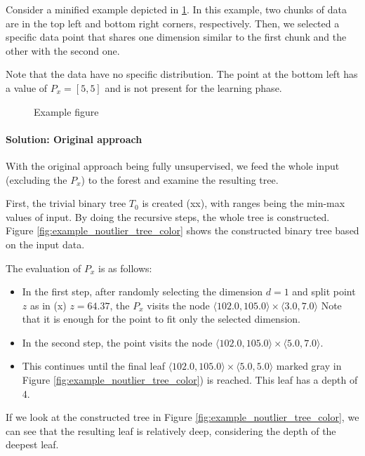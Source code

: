 Consider a minified example depicted in \ref{fig:example_data}. In this example, two chunks of data are in the top left and bottom right corners, respectively. Then, we selected a specific data point that shares one dimension similar to the first chunk and the other with the second one.

Note that the data have no specific distribution. The point at the bottom left has a value of $P_x = [5,5]$ and is not present for the learning phase.

\begin{figure}[htbp]
\centering

\caption{Example figure}
\label{fig:example_data}
\end{figure}


\paragraph{Solution: Original approach}
With the original approach being fully unsupervised, we feed the whole input (excluding the $P_x$) to the forest and examine the resulting tree.

First, the trivial binary tree $T_0$ is created (xx), with ranges being the min-max values of input.
By doing the recursive steps, the whole tree is constructed.
Figure \ref{fig:example_noutlier_tree_color} shows the constructed binary tree based on the input data.

The evaluation of $P_x$ is as follows:
\begin{itemize}
    \item In the first step, after randomly selecting the dimension $d=1$ and split point $z$ as in (x) $z = 64.37$, the $P_x$ visits the node $\langle 102.0, 105.0\rangle \times \langle 3.0, 7.0\rangle$
    Note that it is enough for the point to fit only the selected dimension.
    \item In the second step, the point visits the node $\langle 102.0, 105.0\rangle \times \langle 5.0, 7.0\rangle$.
    \item This continues until the final leaf $\langle 102.0, 105.0\rangle \times \langle 5.0, 5.0\rangle$ marked gray in Figure \ref{fig:example_noutlier_tree_color}) is reached. This leaf has a depth of 4.
    
\end{itemize}


If we look at the constructed tree in Figure \ref{fig:example_noutlier_tree_color}, we can see that the resulting leaf is relatively deep, considering the depth of the deepest leaf.


